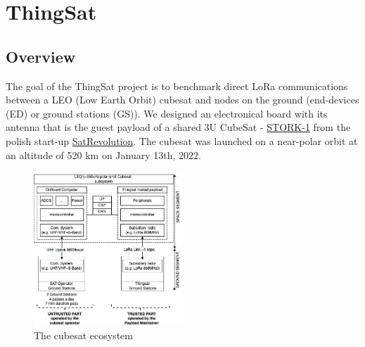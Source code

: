 \section{ThingSat}
\label{sec:case-study}

\subsection{Overview}



The goal of the ThingSat project is to benchmark direct LoRa communications
between a LEO (Low Earth Orbit) cubesat and nodes on the ground (end-devices
(ED) or ground stations (GS)). We designed an electronical board with its
antenna that is the guest payload of a shared 3U CubeSat -
\href{https://space.skyrocket.de/doc_sdat/stork-1.htm}{STORK-1} from the polish
start-up \href{https://www.satrevolution.com/}{SatRevolution}. The cubesat was
launched on a near-polar orbit at an altitude of 520 km on January 13th, 2022. 

\begin{figure}[ht]
    \includegraphics[width=0.5\textwidth]{Figures/globecom-thingsat.jpg}
    \caption{The cubesat ecosystem}
    \label{fig:archi}
\end{figure}

